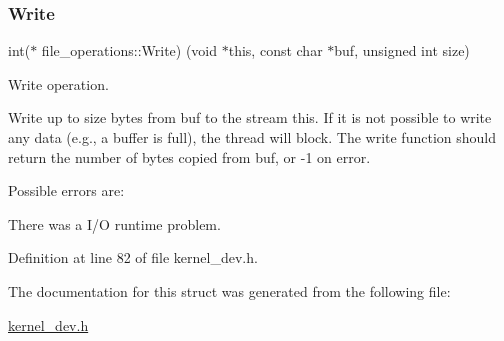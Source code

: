 \subsubsection{\texorpdfstring{Write}{Write}}
{\footnotesize\ttfamily int($\ast$ file\+\_\+operations\+::\+Write) (void $\ast$this, const char $\ast$buf, unsigned int size)}



Write operation. 

Write up to \textquotesingle{}size\textquotesingle{} bytes from \textquotesingle{}buf\textquotesingle{} to the stream \textquotesingle{}this\textquotesingle{}. If it is not possible to write any data (e.\+g., a buffer is full), the thread will block. The write function should return the number of bytes copied from buf, or -\/1 on error.

Possible errors are\+:
\begin{DoxyItemize}
\item There was a I/O runtime problem. 
\end{DoxyItemize}

Definition at line 82 of file kernel\+\_\+dev.\+h.



The documentation for this struct was generated from the following file\+:\begin{DoxyCompactItemize}
\item 
\hyperlink{kernel__dev_8h}{kernel\+\_\+dev.\+h}\end{DoxyCompactItemize}
